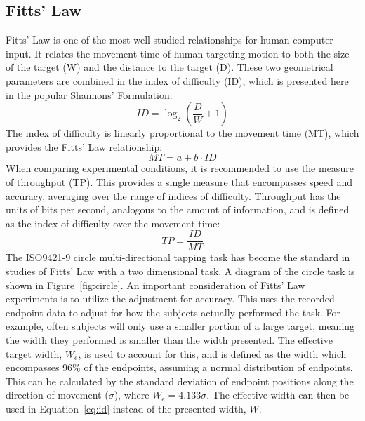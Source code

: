 \documentclass[]{aiaa-tc}%
\begin{document}
\subsection{Fitts' Law}
Fitts' Law is one of the most well studied relationships for human-computer input\cite{fitts_information_1954}.
It relates the movement time of human targeting motion to both the size of the target (W) and the distance to the target (D).
These two geometrical parameters are combined in the index of difficulty (ID), which is presented here in the popular Shannons' Formulation\cite{mackenzie_note_1989}:
\begin{equation}
  ID=\log_2\left(\frac{D}{W}+1\right)
  \label{eq:id}
\end{equation}
The index of difficulty is linearly proportional to the movement time (MT), which provides the Fitts' Law relationship:
\begin{equation}
  MT=a+b \cdot ID
\end{equation}
When comparing experimental conditions, it is recommended to use the measure of throughput (TP)\cite{soukoreff_towards_2004}.
This provides a single measure that encompasses speed and accuracy, averaging over the range of indices of difficulty.
Throughput has the units of bits per second, analogous to the amount of information, and is defined as the index of difficulty over the movement time:
\begin{equation}
  TP=\frac{ID}{MT}
  \label{eq:tp}
\end{equation}
The ISO9421-9 circle multi-directional tapping task has become the standard in studies of Fitts' Law with a two dimensional task\cite{international_organization_for_standardization_iso_2000}.
A diagram of the circle task is shown in Figure~\ref{fig:circle}.
An important consideration of Fitts' Law experiments is to utilize the adjustment for accuracy.
This uses the recorded endpoint data to adjust for how the subjects actually performed the task.
For example, often subjects will only use a smaller portion of a large target, meaning the width they performed is smaller than the width presented.
The effective target width, $W_e$, is used to account for this, and is defined as the width which encompasses 96\% of the endpoints, assuming a normal distribution of endpoints.
This can be calculated by the standard deviation of endpoint positions along the direction of movement ($\sigma$), where $W_e = 4.133\sigma$.
The effective width can then be used in Equation~\ref{eq:id} instead of the presented width, $W$.
\end{document}
